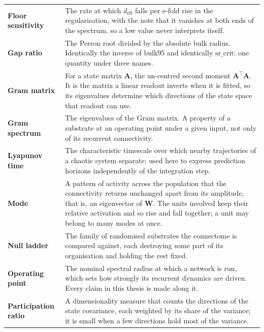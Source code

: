 \begin{longtable}{>{\raggedright\arraybackslash}p{3.4cm}p{\dimexpr\linewidth-3.4cm-4\tabcolsep\relax}}
    \textbf{Floor sensitivity} & The rate at which $d_{\mathrm{eff}}$ falls per e-fold rise in the regularisation, with the note that it vanishes at both ends of the spectrum, so a low value never interprets itself. \\

    \textbf{Gap ratio} & The Perron root divided by the absolute bulk radius. Identically the inverse of $\mathrm{bulk95}$ and identically $\mathrm{sr\_crit}$: one quantity under three names. \\

    \textbf{Gram matrix} & For a state matrix $\mathbf{A}$, the un-centred second moment $\mathbf{A}^{\top}\mathbf{A}$. It is the matrix a linear readout inverts when it is fitted, so its eigenvalues determine which directions of the state space that readout can use. \\

    \textbf{Gram spectrum} & The eigenvalues of the Gram matrix. A property of a substrate at an operating point under a given input, not only of its recurrent connectivity. \\

    \textbf{Lyapunov time} & The characteristic timescale over which nearby trajectories of a chaotic system separate; used here to express prediction horizons independently of the integration step. \\

    \textbf{Mode} & A pattern of activity across the population that the connectivity returns unchanged apart from its amplitude, that is, an eigenvector of $\mathbf{W}$. The units involved keep their relative activation and so rise and fall together; a unit may belong to many modes at once. \\

    \textbf{Null ladder} & The family of randomised substrates the connectome is compared against, each destroying some part of its organisation and holding the rest fixed. \\

    \textbf{Operating point} & The nominal spectral radius at which a network is run, which sets how strongly its recurrent dynamics are driven. Every claim in this thesis is made along it. \\

    \textbf{Participation ratio} & A dimensionality measure that counts the directions of the state covariance, each weighted by its share of the variance; it is small when a few directions hold most of the variance. \\


\end{longtable}
